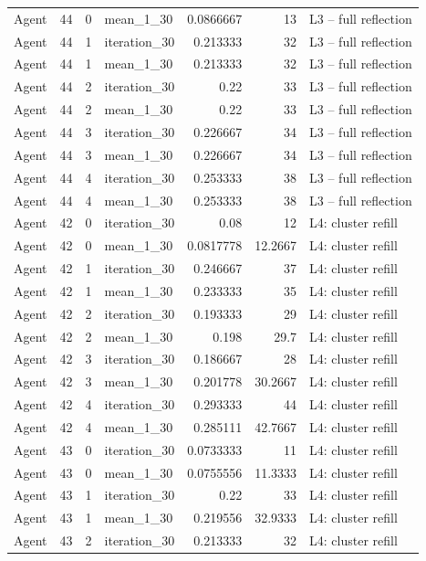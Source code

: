 \begin{table}[htbp!]
\begin{tabular}{lrrlrrl}
Agent & 44 & 0 & mean\_1\_30 & 0.0866667 & 13 & L3 -- full reflection \\
Agent & 44 & 1 & iteration\_30 & 0.213333 & 32 & L3 -- full reflection \\
Agent & 44 & 1 & mean\_1\_30 & 0.213333 & 32 & L3 -- full reflection \\
Agent & 44 & 2 & iteration\_30 & 0.22 & 33 & L3 -- full reflection \\
Agent & 44 & 2 & mean\_1\_30 & 0.22 & 33 & L3 -- full reflection \\
Agent & 44 & 3 & iteration\_30 & 0.226667 & 34 & L3 -- full reflection \\
Agent & 44 & 3 & mean\_1\_30 & 0.226667 & 34 & L3 -- full reflection \\
Agent & 44 & 4 & iteration\_30 & 0.253333 & 38 & L3 -- full reflection \\
Agent & 44 & 4 & mean\_1\_30 & 0.253333 & 38 & L3 -- full reflection \\
Agent & 42 & 0 & iteration\_30 & 0.08 & 12 & L4: cluster refill \\
Agent & 42 & 0 & mean\_1\_30 & 0.0817778 & 12.2667 & L4: cluster refill \\
Agent & 42 & 1 & iteration\_30 & 0.246667 & 37 & L4: cluster refill \\
Agent & 42 & 1 & mean\_1\_30 & 0.233333 & 35 & L4: cluster refill \\
Agent & 42 & 2 & iteration\_30 & 0.193333 & 29 & L4: cluster refill \\
Agent & 42 & 2 & mean\_1\_30 & 0.198 & 29.7 & L4: cluster refill \\
Agent & 42 & 3 & iteration\_30 & 0.186667 & 28 & L4: cluster refill \\
Agent & 42 & 3 & mean\_1\_30 & 0.201778 & 30.2667 & L4: cluster refill \\
Agent & 42 & 4 & iteration\_30 & 0.293333 & 44 & L4: cluster refill \\
Agent & 42 & 4 & mean\_1\_30 & 0.285111 & 42.7667 & L4: cluster refill \\
Agent & 43 & 0 & iteration\_30 & 0.0733333 & 11 & L4: cluster refill \\
Agent & 43 & 0 & mean\_1\_30 & 0.0755556 & 11.3333 & L4: cluster refill \\
Agent & 43 & 1 & iteration\_30 & 0.22 & 33 & L4: cluster refill \\
Agent & 43 & 1 & mean\_1\_30 & 0.219556 & 32.9333 & L4: cluster refill \\
Agent & 43 & 2 & iteration\_30 & 0.213333 & 32 & L4: cluster refill \\

\end{tabular}
\end{table}
